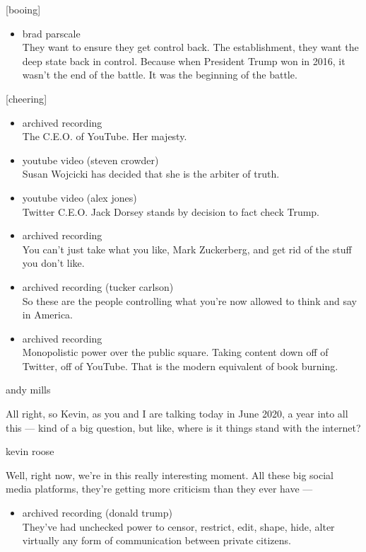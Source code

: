 {[}booing{]}

\begin{itemize}
\tightlist
\item
  brad parscale\\
  They want to ensure they get control back. The establishment, they
  want the deep state back in control. Because when President Trump won
  in 2016, it wasn't the end of the battle. It was the beginning of the
  battle.
\end{itemize}

{[}cheering{]}

\begin{itemize}
\item
  archived recording\\
  The C.E.O. of YouTube. Her majesty.
\item
  youtube video (steven crowder)\\
  Susan Wojcicki has decided that she is the arbiter of truth.
\item
  youtube video (alex jones)\\
  Twitter C.E.O. Jack Dorsey stands by decision to fact check Trump.
\item
  archived recording\\
  You can't just take what you like, Mark Zuckerberg, and get rid of the
  stuff you don't like.
\item
  archived recording (tucker carlson)\\
  So these are the people controlling what you're now allowed to think
  and say in America.
\item
  archived recording\\
  Monopolistic power over the public square. Taking content down off of
  Twitter, off of YouTube. That is the modern equivalent of book
  burning.
\end{itemize}

andy mills

All right, so Kevin, as you and I are talking today in June 2020, a year
into all this --- kind of a big question, but like, where is it things
stand with the internet?

kevin roose

Well, right now, we're in this really interesting moment. All these big
social media platforms, they're getting more criticism than they ever
have ---

\begin{itemize}
\tightlist
\item
  archived recording (donald trump)\\
  They've had unchecked power to censor, restrict, edit, shape, hide,
  alter virtually any form of communication between private citizens.
\end{itemize}

